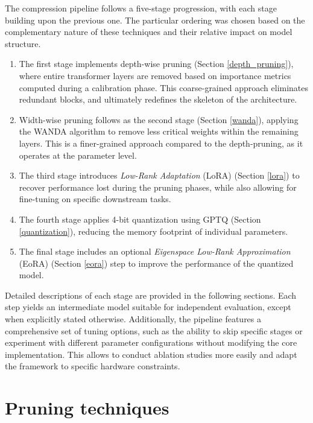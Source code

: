 The compression pipeline follows a five-stage progression, with each stage building upon the previous one. The particular ordering was chosen based on the complementary nature of these techniques and their relative impact on model structure.

\begin{enumerate}
    \item The first stage implements depth-wise pruning (Section \ref{depth_pruning}), where entire transformer layers are removed based on importance metrics computed during a calibration phase. This coarse-grained approach eliminates redundant blocks, and ultimately redefines the skeleton of the architecture.

    \item Width-wise pruning follows as the second stage (Section \ref{wanda}), applying the WANDA algorithm \cite{wanda} to remove less critical weights within the remaining layers. This is a finer-grained approach compared to the depth-pruning, as it operates at the parameter level.

    \item The third stage introduces \textit{Low-Rank Adaptation} (LoRA) \cite{lora} (Section \ref{lora}) to recover performance lost during the pruning phases, while also allowing for fine-tuning on specific downstream tasks.

    \item The fourth stage applies 4-bit quantization using GPTQ \cite{gptq_quantization} (Section \ref{quantization}), reducing the memory footprint of individual parameters.

    \item The final stage includes an optional \textit{Eigenspace Low-Rank Approximation} (EoRA) \cite{eora} (Section \ref{eora}) step to improve the performance of the quantized model.
\end{enumerate}

Detailed descriptions of each stage are provided in the following sections. Each step yields an intermediate model suitable for independent evaluation, except when explicitly stated otherwise. Additionally, the pipeline features a comprehensive set of tuning options, such as the ability to skip specific stages or experiment with different parameter configurations without modifying the core implementation. This allows to conduct ablation studies more easily and adapt the framework to specific hardware constraints.

\section{Pruning techniques} \label{pruning}

